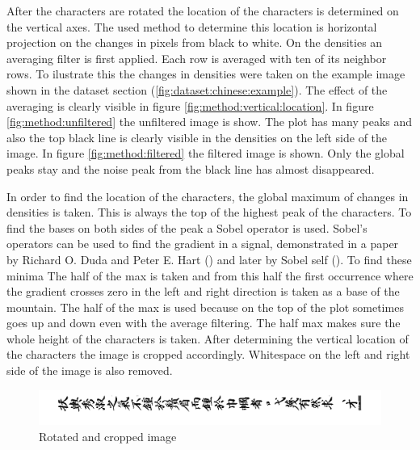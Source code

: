 After the characters are rotated the location of the characters is determined on the vertical axes. The used method to determine this location is horizontal projection on the changes in pixels from black to white. On the densities an averaging filter is first applied. Each row is averaged with ten of its neighbor rows. To ilustrate this the changes in densities were taken on the example image shown in the dataset section (\ref{fig:dataset:chinese:example}). The effect of the averaging is clearly visible in figure \ref{fig:method:vertical:location}. In figure \ref{fig:method:unfiltered} the unfiltered image is show. The plot has many peaks and also the top black line is clearly visible in the densities on the left side of the image. In figure \ref{fig:method:filtered} the filtered image is shown. Only the global peaks stay and the noise peak from the black line has almost disappeared.

In order to find the location of the characters, the global maximum of changes in densities is taken. This is always the top of the highest peak of the characters. To find the bases on both sides of the peak a Sobel operator is used. Sobel's operators can be used to find the gradient in a signal, demonstrated in a paper by Richard O. Duda and Peter E. Hart (\cite{Duda}) and later by Sobel self (\cite{Sobel}). To find these minima The half of the max is taken and from this half the first occurrence where the gradient crosses zero in the left and right direction is taken as a base of the mountain. The half of the max is used because on the top of the plot sometimes goes up and down even with the average filtering. The half max makes sure the whole height of the characters is taken. After determining the vertical location of the characters the image is cropped accordingly. Whitespace on the left and right side of the image is also removed.

\begin{figure}[ht]
  \centering
  \includegraphics[width=\textwidth]{./images/method/trimmed.png}
  \caption{Rotated and cropped image}
  \label{fig:method:vertical:cropped}
\end{figure}

